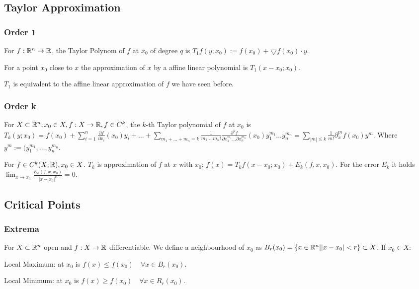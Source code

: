 \subsection{Taylor Approximation}
\subsubsection{Order 1}
For $f: \mathbb{R}^n \to \mathbb{R}$, the Taylor Polynom of $f$ at $x_0$ of degree $q$ is $T_1f(y; x_0) := f(x_0) + \bigtriangledown f(x_0) \cdot y$.

For a point $x_0$ close to $x$ the approximation of $x$ by a affine linear polynomial is $T_1(x - x_0; x_0)$.

\begin{compactitem}
    \item $T_1$ is equivalent to the affine linear approximation of $f$ we have seen before.
\end{compactitem}

\subsubsection{Order k}
For $X \subset \mathbb{R}^n, x_0 \in X, f: X \to \mathbb{R}, f \in C^k$, the $k$-th Taylor polynomial of $f$ at $x_0$ is $T_k(y; x_0) = f(x_0) + \sum_{i=1}^{n} \frac{\partial f}{\partial x_i} (x_0) y_i + \dots + \sum_{m_1 + \dots + m_n = k} \frac{1}{m_1! \dots m_n!}\frac{\partial^k f}{\partial x_1^{m_1} \dots \partial x_n^{m_n}}(x_0)y_1^{m_1} \dots y_n^{m_n} = \sum_{|m| \le k} \frac{1}{m!} \partial_x^m f(x_0) y^m$. Where $y^m := (y_1^{m_1}, \dots , y_n^{m_n}$.

For $f \in C^k(X; \mathbb{R}), x_0 \in X$. $T_k$ is approximation of $f$ at $x$ with $x_0$: $f(x) = T_kf(x - x_0; x_0) + E_k(f, x, x_0)$. For the error $E_k$ it holds $\lim_{x \to x_0} \frac{E_k(f, x, x_0)}{|x - x_0|^k} = 0$.

\subsection{Critical Points}
\subsubsection{Extrema}
For $X \subset \mathbb{R}^n$ open and $f: X \to \mathbb{R}$ differentiable. We define a neighbourhood of $x_0$ as $B_r(x_0) = \{x \in \mathbb{R}^n | |x - x_0| < r\} \subset X$. If $x_0 \in X$:

\begin{compactdesc}
    \item[Local Maximum:] at $x_0$ is $f(x) \le f(x_0) \quad \forall x \in B_r(x_0)$.
    \item[Local Minimum:] at $x_0$ is $f(x) \ge f(x_0) \quad \forall x \in R_r(x_0)$.
\end{compactdesc}

